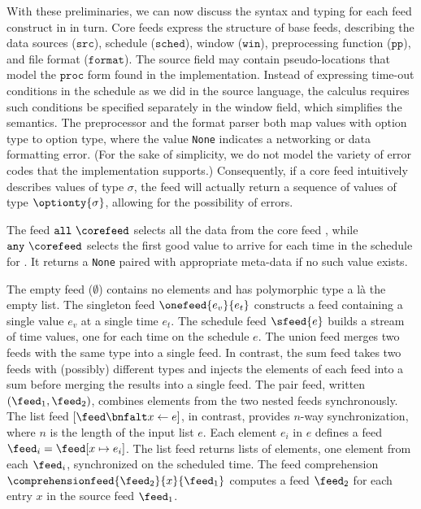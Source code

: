 With these preliminaries, we can now discuss the syntax and typing for
each feed construct in  in turn. 
Core feeds express the structure of base feeds, describing
the data sources ($\mathtt{src}$), schedule ($\mathtt{sched}$), window
($\mathtt{win}$), preprocessing function ($\mathtt{pp}$), and file
format ($\mathtt{format}$).  The source field may contain
pseudo-locations that model the $\mathtt{proc}$ form found in the
implementation.  Instead of expressing time-out conditions in the
schedule as we did in the source language, the calculus requires such
conditions be specified separately in the window field, which simplifies
the semantics.  The preprocessor and the format parser both map values
with option type to option type, where the value \texttt{None}
indicates a networking or data formatting error. (For the sake of
simplicity, we do not model the variety of error codes that the
implementation supports.)  Consequently, if a core feed intuitively
describes values of type $\sigma$, the feed will actually return a
sequence of values of type $\optionty{\sigma}$, allowing for the
possibility of errors.  

The feed $\mathtt{all}\ \corefeed$ selects all the data from the core
feed \corefeed, while $\mathtt{any}\ \corefeed$ selects the first
good value to arrive for each time in the schedule for \corefeed{}.
It returns a \texttt{None} paired with appropriate meta-data if no
such value exists.   

The empty feed ($\emptyset$) contains no elements and has polymorphic
type a l\`a the empty list.  The singleton feed $\onefeed{e_v}{e_t}$
constructs a feed containing a single value $e_v$ at a single time
$e_t$.  The schedule feed $\sfeed{e}$ builds a stream of
time values, one for each time on the schedule $e$.
The union feed merges two feeds with the same type
into a single feed.  In contrast, the sum feed takes two feeds
with (possibly) different types and injects the elements of each feed
into a sum before merging the results into a single feed.  
The pair feed, written $(\feed_1, \feed_2)$, combines elements from
the two nested feeds synchronously.  
The list feed $[\feed \bnfalt x \leftarrow e ]$, in contrast, provides
$n$-way synchronization, where $n$ is the length of the input list
$e$.  Each element $e_i$ in $e$ defines a feed $\feed_i = \feed[x \mapsto e_i]$.
The list feed returns lists of elements, one element from each
$\feed_i$, synchronized on the scheduled time.  The feed comprehension
$\comprehensionfeed{\feed_2}{x}{\feed_1}$ computes a feed $\feed_2$
for each entry $x$ in the source feed $\feed_1$.




